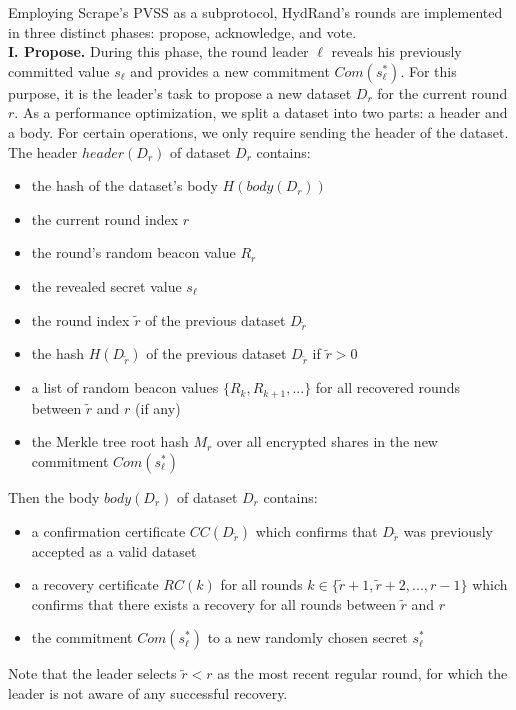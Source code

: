 \documentclass[letterpaper,twocolumn,10pt]{article}
\theoremstyle{definition}
\theoremstyle{remark}
\begin{document}
Employing Scrape's PVSS as a subprotocol, HydRand's rounds are implemented in three distinct phases: propose, acknowledge, and vote.\\

\textbf{I. Propose.} During this phase, the round leader $\ell$ reveals his previously committed value $s_\ell$ and provides a new commitment $Com(s^*_\ell)$. For this purpose, it is the leader's task to propose a new dataset $D_r$ for the current round $r$. As a performance optimization, we split a dataset into two parts: a header and a body. For certain operations, we only require sending the header of the dataset. The header $header(D_r)$ of dataset $D_r$ contains:
\begin{itemize}
\item the hash of the dataset's body $H(body(D_r))$
\item the current round index $r$
\item the round's random beacon value $R_r$
\item the revealed secret value $s_\ell$
\item the round index $\tilde{r}$ of the previous dataset $D_{\tilde{r}}$
\item the hash $H(D_{\tilde{r}})$ of the previous dataset $D_{\tilde{r}}$ if $\tilde{r} > 0$
\item a list of random beacon values $\{R_k, R_{k + 1}, ...\}$ for all recovered rounds between $\tilde{r}$ and $r$ (if any)
\item the Merkle tree root hash $M_r$ over all encrypted shares in the new commitment $Com(s^*_\ell)$
\end{itemize}

Then the body $body(D_r)$ of dataset $D_r$ contains:
\begin{itemize}
\item a confirmation certificate $CC(D_{\tilde{r}})$ which confirms that $D_{\tilde{r}}$ was previously accepted as a valid dataset
\item a recovery certificate $RC(k)$ for all rounds $k \in \{\tilde{r} + 1, \tilde{r} + 2, ..., r - 1\}$ which confirms that there exists a recovery for all rounds between $\tilde{r}$ and $r$
\item the commitment $Com(s^*_\ell)$ to a new randomly chosen secret $s^*_\ell$
\end{itemize}
Note that the leader selects $\tilde{r} < r$ as the most recent regular round, for which the leader is not aware of any successful recovery.
\end{document}
